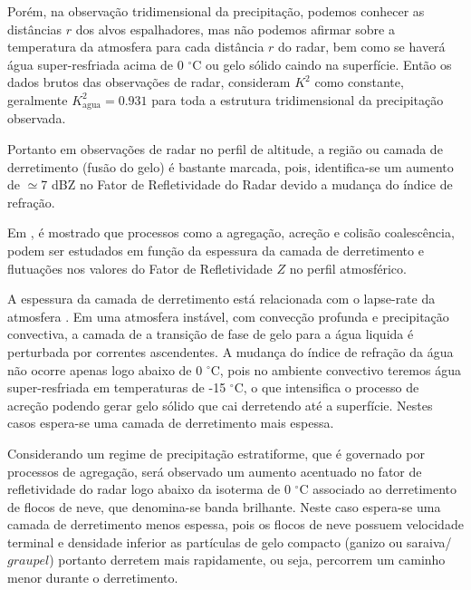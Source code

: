 Porém, na observação tridimensional da precipitação, podemos conhecer as distâncias $r$ dos alvos espalhadores, mas não podemos afirmar sobre a temperatura da atmosfera para cada distância $r$ do radar, bem como se haverá água super-resfriada acima de 0 $^{\circ}$C ou gelo sólido caindo na superfície. Então os dados brutos das observações de radar, consideram $K^2$ como constante, geralmente $K_{\mathrm{agua}}^2 = 0.931$  para toda a estrutura tridimensional da precipitação observada.

Portanto em observações de radar no perfil de altitude, a região ou camada de derretimento (fusão do gelo) é bastante marcada, pois, identifica-se um aumento de $\simeq$7 dBZ no Fator de Refletividade do Radar devido a mudança do índice de refração.

Em , é mostrado que processos como a agregação, acreção e colisão coalescência, podem ser estudados em função da espessura da camada de derretimento e flutuações nos valores do Fator de Refletividade $Z$ no perfil atmosférico. 

A espessura da camada de derretimento está relacionada com o lapse-rate da atmosfera \cite[p.~462]{mason1971_2ed}. Em uma atmosfera instável, com convecção profunda e precipitação convectiva, a camada de a transição de fase de gelo para a água liquida é perturbada por correntes ascendentes. A mudança do índice de refração da água não ocorre apenas logo abaixo de 0 $^{\circ}$C, pois no ambiente convectivo teremos água super-resfriada em temperaturas de -15 $^{\circ}$C, o que intensifica o processo de acreção podendo gerar gelo sólido que cai derretendo até a superfície. Nestes casos espera-se uma camada de derretimento mais espessa.

Considerando um regime de precipitação estratiforme, que é governado por processos de agregação, será observado um aumento acentuado no fator de refletividade do radar logo abaixo da isoterma de 0 $^{\circ}$C associado ao derretimento de flocos de neve, que denomina-se banda brilhante. Neste caso espera-se uma camada de derretimento menos espessa, pois os flocos de neve possuem velocidade terminal e densidade inferior as partículas de gelo compacto (ganizo ou saraiva/$graupel$) portanto derretem mais rapidamente, ou seja, percorrem um caminho menor durante o derretimento. 




